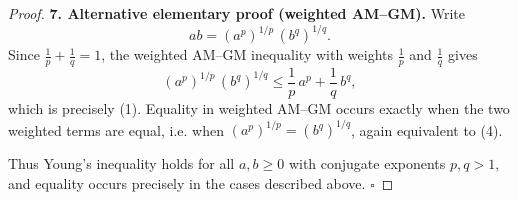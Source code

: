 \begin{proof}
\medskip\noindent\textbf{7. Alternative elementary proof (weighted AM–GM).}  
Write
\[
ab=(a^{p})^{1/p}\,(b^{q})^{1/q}.
\]
Since \(\frac1p+\frac1q=1\), the weighted AM–GM inequality with weights
\(\frac1p\) and \(\frac1q\) gives
\[
(a^{p})^{1/p}\,(b^{q})^{1/q}
\le\frac1p\,a^{p}+\frac1q\,b^{q},
\]
which is precisely (1). Equality in weighted AM–GM occurs exactly when the
two weighted terms are equal, i.e. when \((a^{p})^{1/p}=(b^{q})^{1/q}\), again
equivalent to (4).

Thus Young’s inequality holds for all \(a,b\ge0\) with conjugate exponents
\(p,q>1\), and equality occurs precisely in the cases described above. \(\square\)
\end{proof}